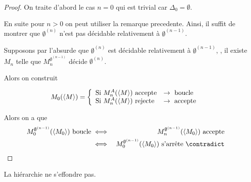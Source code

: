 \begin{proof}
	On traite d'abord le cas $n = 0$ qui est trivial car $\Delta_0 = \emptyset$.

	En suite pour $n > 0$ on peut utiliser la remarque precedente. Ainsi, il suffit de montrer que $\emptyset^{(n)}$ n'est pas décidable relativement à $\emptyset^{(n-1)}$.

	Supposons par l'absurde que $\emptyset^{(n)}$ est décidable relativement à $\emptyset^{(n-1)}$, \ie, il existe $M_n$ telle que $M_n^{\emptyset^{(n-1)}}$ décide $\emptyset^{(n)}$.

	Alors on construit

	$$
		M_0(\left\langle M\right\rangle) =
		\left\{
		\begin{array}{ll}
			\text{Si } M_n^A(\left\langle M\right\rangle) \text{ accepte} & \rightarrow \text{ boucle}  \\
			\text{Si } M_n^A(\left\langle M\right\rangle) \text{ rejecte} & \rightarrow \text{ accepte} \\
		\end{array}
		\right.
	$$

	Alors on a que
	\begin{eqnarray*}
		M_0^{\emptyset^{(n-1)}}(\encode{M_0}) \text{ boucle} &\iff& M_n^{\emptyset^{(n-1)}} (\encode {M_0}) \text{ accepte} \\
		&\iff& M_0^{\emptyset^{(n-1)}}(\encode{M_0}) \text{ s'arrête} \ \contradict
	\end{eqnarray*}
\end{proof}


\begin{coro}
	La hiérarchie ne s'effondre pas.
\end{coro}
